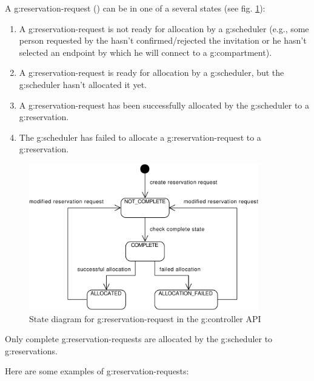 A \gls{g:reservation-request} () can be in one of a several states (see fig. \ref{fig:smd_api_reservation_request}):
\begin{enumerate}
\item {} A \gls{g:reservation-request} is not ready for allocation by a \gls{g:scheduler} (e.g., some person requested by the  hasn't confirmed/rejected the invitation or he hasn't selected an endpoint by which he will connect to a \gls{g:compartment}).
\item {} A \gls{g:reservation-request} is ready for allocation by a \gls{g:scheduler}, but the \gls{g:scheduler} hasn't allocated it yet.
\item {} A \gls{g:reservation-request} has been successfully allocated by the \gls{g:scheduler} to a \gls{g:reservation}.
\item {} The \gls{g:scheduler} has failed to allocate a \gls{g:reservation-request} to a \gls{g:reservation}.
\end{enumerate}

\begin{figure}[ht!]
\centering\includegraphics[width=10cm]{diagrams/smd_api_reservation_request}
\caption{State diagram for \gls{g:reservation-request} in the \gls{g:controller} API}
\label{fig:smd_api_reservation_request}
\end{figure}

Only complete \glspl{g:reservation-request} are allocated by the \gls{g:scheduler} to \glspl{g:reservation}.

Here are some examples of \glspl{g:reservation-request}:

